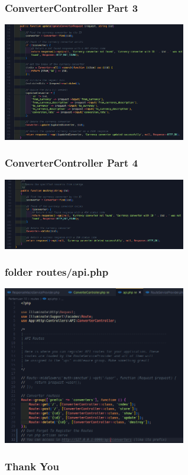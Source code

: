 \documentclass[aspectratio=169, table]{beamer}
\begin{document}
\begin{frame}[fragile]
 \frametitle{ConverterController Part 3}
 \vskip1cm
 \begin{center}
  \includegraphics[width=0.6\textwidth]{classFiles/pertemuan-10-controller-part-3.png}
 \end{center}
\end{frame}

\begin{frame}[fragile]
 \frametitle{ConverterController Part 4}
 \vskip1cm
 \begin{center}
  \includegraphics[width=0.6\textwidth]{classFiles/pertemuan-10-controller-part-4.png}
 \end{center}
\end{frame}

\begin{frame}[fragile]
 \frametitle{folder routes/api.php}
 \vskip1cm
 \begin{center}
  \includegraphics[width=0.6\textwidth]{classFiles/pertemuan-10-routes-api.png}
 \end{center}
\end{frame}

\begin{frame4}
    \frametitle{Thank You}
\end{frame4}
\end{document}
